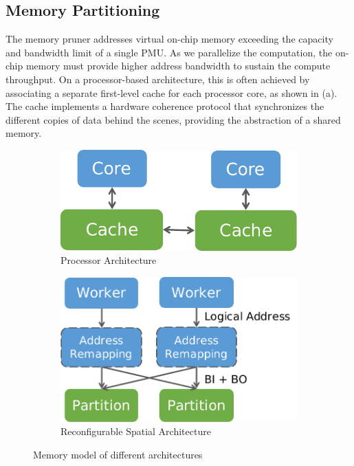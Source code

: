 \subsection{Memory Partitioning} \label{sec:memsplit}
The memory pruner addresses virtual on-chip memory exceeding the capacity and bandwidth limit of a
single PMU.
As we parallelize the computation, the on-chip memory must provide higher address bandwidth to sustain the
compute throughput.
On a processor-based architecture, this is often achieved by associating a separate first-level
cache for each processor core, as shown in  (a).
The cache implements a hardware coherence protocol that synchronizes the different copies of data
behind the scenes,
providing the abstraction of a shared memory.

\begin{figure}
  \begin{subfigure}[b]{0.35\textwidth}
  \centering
  \includegraphics[width=1\columnwidth]{figs/cpumemmodel.pdf}
  \caption{Processor Architecture}
  \end{subfigure}
  \hfill
  \begin{subfigure}[b]{0.45\textwidth}
  \centering
  \includegraphics[width=1\columnwidth]{figs/spatialmemmodel.pdf}
  \caption{Reconfigurable Spatial Architecture}
  \end{subfigure}
  \caption[Memory model of different architectures]{Memory model of different architectures}
  \label{fig:memmodel}
\end{figure}

